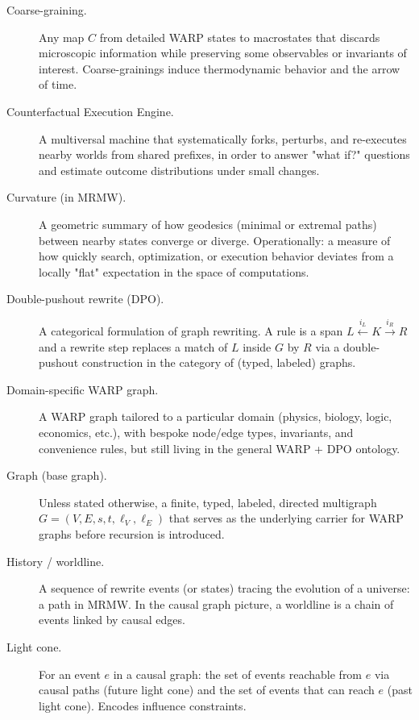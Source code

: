 \begin{description}
  \item[Coarse-graining.]
    Any map $C$ from detailed WARP states to macrostates that discards
    microscopic information while preserving some observables or invariants
    of interest. Coarse-grainings induce thermodynamic behavior and the
    arrow of time.

  \item[Counterfactual Execution Engine.]
    A multiversal machine that systematically forks, perturbs, and
    re-executes nearby worlds from shared prefixes, in order to answer
    "what if?" questions and estimate outcome distributions under
    small changes.

  \item[Curvature (in MRMW).]
    A geometric summary of how geodesics (minimal or extremal paths) between
    nearby states converge or diverge. Operationally: a measure of how
    quickly search, optimization, or execution behavior deviates from a
    locally "flat" expectation in the space of computations.

  \item[Double-pushout rewrite (DPO).]
    A categorical formulation of graph rewriting. A rule is a span
    $L \xleftarrow{i_L} K \xrightarrow{i_R} R$ and a rewrite step replaces
    a match of $L$ inside $G$ by $R$ via a double-pushout construction
    in the category of (typed, labeled) graphs.

  \item[Domain-specific WARP graph.]
    A WARP graph tailored to a particular domain (physics, biology, logic,
    economics, etc.), with bespoke node/edge types, invariants, and
    convenience rules, but still living in the general WARP + DPO ontology.

  \item[Graph (base graph).]
    Unless stated otherwise, a finite, typed, labeled, directed multigraph
    $G = (V,E,s,t,\ell_V,\ell_E)$ that serves as the underlying carrier for
    WARP graphs before recursion is introduced.

  \item[History / worldline.]
    A sequence of rewrite events (or states) tracing the evolution of a
    universe: a path in MRMW. In the causal graph picture, a worldline is
    a chain of events linked by causal edges.

  \item[Light cone.]
    For an event $e$ in a causal graph: the set of events reachable from
    $e$ via causal paths (future light cone) and the set of events that
    can reach $e$ (past light cone). Encodes influence constraints.


\end{description}
